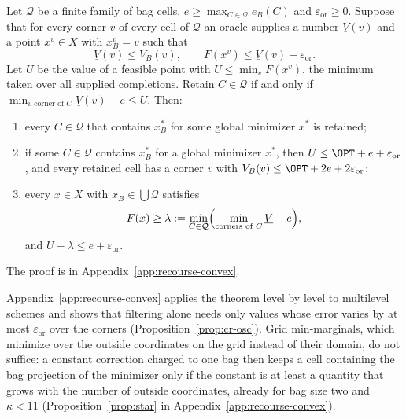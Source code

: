 \begin{theorem}\label{thm:cr-filter}
Let $\mathcal Q$ be a finite family of bag cells,
$e\ge\max_{C\in\mathcal Q}e_B(C)$ and $\varepsilon_{\mathrm{or}}\ge0$. Suppose that for every
corner $v$ of every cell of $\mathcal Q$ an oracle supplies a number
$\underline V(v)$ and a point $x^v\in X$ with $x^v_B=v$ such that
\begin{equation}\label{eq:cr-oracle}
\underline V(v)\le V_B(v),\qquad F(x^v)\le\underline V(v)+\varepsilon_{\mathrm{or}} .
\end{equation}
Let $U$ be the value of a feasible point with $U\le\min_vF(x^v)$, the
minimum taken over all supplied completions. Retain $C\in\mathcal Q$ if and
only if $\min_{v\text{ corner of }C}\underline V(v)-e\le U$. Then:
\begin{enumerate}
\item[(a)] every $C\in\mathcal Q$ that contains $x^*_B$ for some global
minimizer $x^*$ is retained;
\item[(b)] if some $C\in\mathcal Q$ contains $x^*_B$ for a global minimizer
$x^*$, then $U\le\OPT+e+\varepsilon_{\mathrm{or}}$, and every retained cell has a corner $v$
with $V_B(v)\le\OPT+2e+2\varepsilon_{\mathrm{or}}$;
\item[(c)] every $x\in X$ with $x_B\in\bigcup\mathcal Q$ satisfies
\[
F(x)\ge\lambda:=\min_{C\in\mathcal Q}\Bigl(\min_{\text{corners of }C}\underline V-e\Bigr),
\]
and $U-\lambda\le e+\varepsilon_{\mathrm{or}}$.
\end{enumerate}
\end{theorem}
The proof is in Appendix~\ref{app:recourse-convex}.

Appendix~\ref{app:recourse-convex} applies the theorem level by level to
multilevel schemes and shows that filtering alone needs only values whose
error varies by at most $\varepsilon_{\mathrm{or}}$ over the corners
(Proposition~\ref{prop:cr-osc}). Grid min-marginals, which minimize over
the outside coordinates on the grid instead of their domain, do not suffice:
a constant correction charged to one bag then keeps a cell containing the bag
projection of the minimizer only if the constant is at least a quantity that
grows with the number of outside coordinates, already for bag size two and
$\kappa<11$
(Proposition~\ref{prop:star} in Appendix~\ref{app:recourse-convex}).
